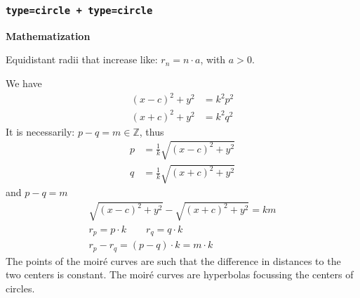 \documentclass[%
    11pt,
    english,
    BCOR10mm,
    DIV12,
    bibliography=totoc,
    parskip=false,
    fleqn,
    smallheadings,
    headexclude,
    footexclude,
    oneside,
    dvipsnames,
    svgnames,
    x11names
]{pst-doc}
\begin{document}
{{{\subsubsection{\texttt{type=circle + type=circle}}

\begin{center}
\hfill
{}
\end{center}
\textbf{Mathematization}

Equidistant radii that increase like: $r_n=n\cdot a$, with $a>0$.

We have
\begin{align*}
(x-c)^2+y^2&=k^2p^2\\
(x+c)^2+y^2&=k^2q^2
\end{align*}
It is necessarily: $p-q=m\in\mathbb{Z}$, thus
\begin{align*}
p&=\frac{1}{k}\sqrt{(x-c)^2+y^2}\\
q&=\frac{1}{k}\sqrt{(x+c)^2+y^2}
\end{align*}
and $p-q=m$
\begin{gather*}
\sqrt{(x-c)^2+y^2}-\sqrt{(x+c)^2+y^2}= k m\\
r_p=p\cdot k\qquad r_q=q\cdot k\\
r_p-r_q=(p-q)\cdot k=m\cdot k
\end{gather*}
The points of the moiré curves are such that the difference in distances to the two centers is constant. The moiré curves are hyperbolas focussing the centers of circles.

}}}
\end{document}
